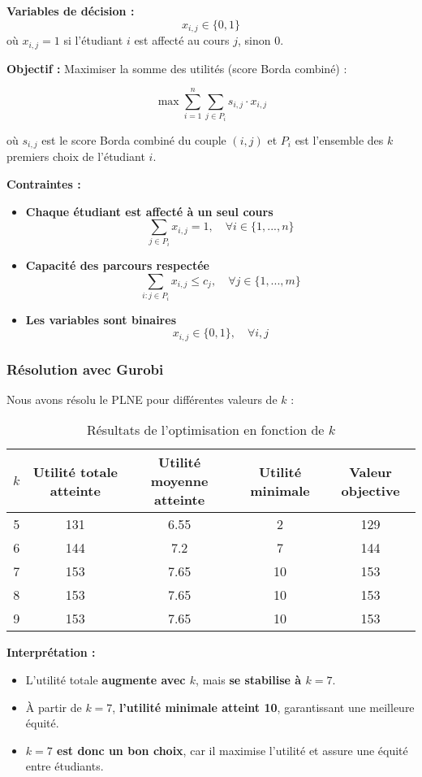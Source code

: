 \documentclass[a4paper,11pt]{article}
\begin{document}
\textbf{Variables de décision :}  
\[
x_{i,j} \in \{0,1\}
\]
où \( x_{i,j} = 1 \) si l'étudiant \( i \) est affecté au cours \( j \), sinon \( 0 \).

\textbf{Objectif :}  
Maximiser la somme des utilités (score Borda combiné) :

\[
\max \sum_{i=1}^{n} \sum_{j \in P_i} s_{i,j} \cdot x_{i,j}
\]

où \( s_{i,j} \) est le score Borda combiné du couple \( (i,j) \) et \( P_i \) est l’ensemble des \( k \) premiers choix de l’étudiant \( i \).

\textbf{Contraintes :}
\begin{itemize}
    \item \textbf{Chaque étudiant est affecté à un seul cours}  
    \[
    \sum_{j \in P_i} x_{i,j} = 1, \quad \forall i \in \{1, ..., n\}
    \]
    \item \textbf{Capacité des parcours respectée}  
    \[
    \sum_{i: j \in P_i} x_{i,j} \leq c_j, \quad \forall j \in \{1, ..., m\}
    \]
    \item \textbf{Les variables sont binaires}  
    \[
    x_{i,j} \in \{0,1\}, \quad \forall i, j
    \]
\end{itemize}

\subsubsection{Résolution avec Gurobi}

Nous avons résolu le PLNE pour différentes valeurs de \( k \) :

\begin{table}[h]
    \centering
    \begin{tabular}{|c|c|c|c|c|}
        \hline
        \( k \) & Utilité totale atteinte & Utilité moyenne atteinte & Utilité minimale & Valeur objective \\
        \hline
        5 & 131 & 6.55 & 2 & 129 \\
        6 & 144 & 7.2 & 7 & 144 \\
        7 & 153 & 7.65 & 10 & 153 \\
        8 & 153 & 7.65 & 10 & 153 \\
        9 & 153 & 7.65 & 10 & 153 \\
        \hline
    \end{tabular}
    \caption{Résultats de l'optimisation en fonction de \( k \)}
\end{table}

\textbf{Interprétation :}
\begin{itemize}
    \item L’utilité totale \textbf{augmente avec \( k \)}, mais \textbf{se stabilise à \( k = 7 \)}.
    \item À partir de \( k = 7 \), \textbf{l’utilité minimale atteint 10}, garantissant une meilleure équité.
    \item \textbf{\( k = 7 \) est donc un bon choix}, car il maximise l’utilité et assure une équité entre étudiants.
\end{itemize}
\end{document}
